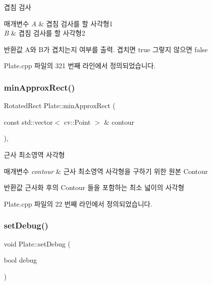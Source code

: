 겹침 검사 


\begin{DoxyParams}{매개변수}
{\em A} & 겹침 검사를 할 사각형1 \\
\hline
{\em B} & 겹침 검사를 할 사각형2 \\
\hline
\end{DoxyParams}
\begin{DoxyReturn}{반환값}
A와 B가 겹치는지 여부를 출력. 겹치면 true 그렇지 않으면 false 
\end{DoxyReturn}


Plate.\+cpp 파일의 321 번째 라인에서 정의되었습니다.

\mbox{\label{class_plate_a2c048194ebdfbaeede0068dcbefbd4cf}} 
\subsubsection{\texorpdfstring{min\+Approx\+Rect()}{minApproxRect()}}
{\footnotesize\ttfamily Rotated\+Rect Plate\+::min\+Approx\+Rect (\begin{DoxyParamCaption}\item[{const std\+::vector$<$ cv\+::\+Point $>$ \&}]{contour }\end{DoxyParamCaption})\hspace{0.3cm}{\ttfamily [static]}, {\ttfamily [private]}}



근사 최소영역 사각형 


\begin{DoxyParams}{매개변수}
{\em contour} & 근사 최소영역 사각형을 구하기 위한 원본 Contour \\
\hline
\end{DoxyParams}
\begin{DoxyReturn}{반환값}
근사화 후의 Contour 들을 포함하는 최소 넓이의 사각형 
\end{DoxyReturn}


Plate.\+cpp 파일의 22 번째 라인에서 정의되었습니다.

\mbox{\label{class_plate_a4f307c5bc7cf3c5887d704fbeed3fd8a}} 
\subsubsection{\texorpdfstring{set\+Debug()}{setDebug()}}
{\footnotesize\ttfamily void Plate\+::set\+Debug (\begin{DoxyParamCaption}\item[{bool}]{debug }\end{DoxyParamCaption})}



